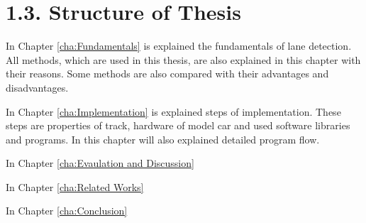 \section*{1.3. Structure of Thesis}
\label{sec:Structure of Paper}

In Chapter \ref{cha:Fundamentals} is explained the fundamentals of lane detection. 
All methods, which are used in this thesis, are also explained in this chapter with 
their reasons. Some methods are also compared with their advantages and disadvantages.

In Chapter \ref{cha:Implementation} is explained steps of implementation. These steps
are properties of track, hardware of model car and used software libraries and 
programs. In this chapter will also explained detailed program flow.

In Chapter \ref{cha:Evaulation and Discussion}

In Chapter \ref{cha:Related Works}

In Chapter \ref{cha:Conclusion}
